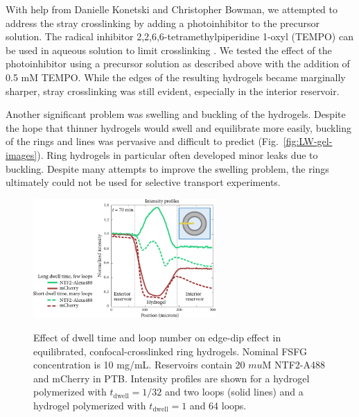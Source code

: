 With help from Danielle Konetski and Christopher Bowman, we attempted to address the stray crosslinking by adding a photoinhibitor to the precursor solution.  The radical inhibitor 2,2,6,6-tetramethylpiperidine 1-oxyl (TEMPO) can be used in aqueous solution to limit crosslinking \cite{chatani14}.  We tested the effect of the photoinhibitor using a precursor solution as described above with the addition of 0.5 mM TEMPO.  While the edges of the resulting hydrogels became marginally sharper, stray crosslinking was still evident, especially in the interior reservoir.


Another significant problem was swelling and buckling of the hydrogels.  Despite the hope that thinner hydrogels would swell and equilibrate more easily, buckling of the rings and lines was pervasive and difficult to predict (Fig.~\ref{fig:LW-gel-images}).  Ring hydrogels in particular often developed minor leaks due to buckling.  Despite many attempts to improve the swelling problem, the rings ultimately could not be used for selective transport experiments.

\begin{figure} %
\caption[Effect of dwell time and loop number on confocal-crosslinked hydrogels.]{Effect of dwell time and loop number on edge-dip effect in equilibrated, confocal-crosslinked ring hydrogels.  Nominal FSFG concentration is 10 mg/mL.  Reservoirs contain 20 $mu$M NTF2-A488 and mCherry in PTB.  Intensity profiles are shown for a hydrogel polymerized with $t_\mathrm{dwell} = 1/32$ and two loops (solid lines) and a hydrogel polymerized with $t_\mathrm{dwell} = 1$ and 64 loops. \\}
\centering
\includegraphics[width=0.62\textwidth]{figs/ch03/dwell-time-effect}
\label{fig:dwell-time-effect}
\end{figure} %

